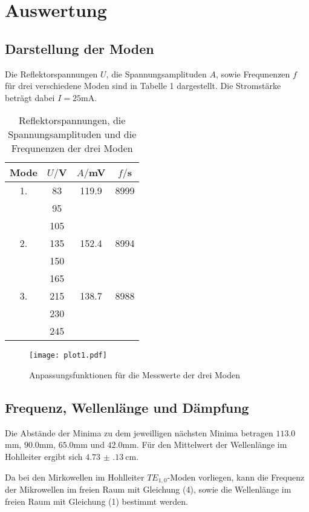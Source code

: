 \section{Auswertung}
\label{sec:Auswertung}

\subsection{Darstellung der Moden}
Die Reflektorspannungen $U$, die Spannungsamplituden $A$, sowie Frequnenzen $f$ für drei verschiedene Moden sind in Tabelle 1 dargestellt.
Die Stromstärke beträgt dabei $I = 25$mA.



\begin{table}[H]
  \centering
  \caption{Reflektorspannungen, die Spannungsamplituden und die Frequnenzen der drei Moden}
  \label{tab:Parameter}
  \begin{tabular}{c c c c}
    \toprule
    Mode & $U/$V & $A/$mV& $f/$s\\
    \midrule
    1. & 83  &   119.9& 8999 \\
       & 95  & &       \\
       & 105 & &       \\
    2. & 135 &   152.4 & 8994 \\
       & 150 & & \\
       & 165 & & \\
    3. & 215 &   138.7 & 8988 \\
       & 230 & & \\
       & 245 & & \\
    \bottomrule
  \end{tabular}
\end{table}

\begin{figure}
  \centering
  \texttt{[image: plot1.pdf]}
  \caption{Anpassungsfunktionen für die Messwerte der drei Moden}
  \label{fig:plot}
\end{figure}



\subsection{Frequenz, Wellenlänge und Dämpfung}
Die Abstände der Minima zu dem jeweilligen nächsten Minima betragen $113.0$mm, $90.0$mm,
$65.0$mm und $42.0$mm.
Für den Mittelwert der Wellenlänge im Hohlleiter ergibt sich $\SI{4.73(13)}{\centi\meter}$.

Da bei den Mirkowellen im Hohlleiter $TE_{1,0}$-Moden vorliegen, kann die Frequenz der
Mikrowellen im freien Raum mit Gleichung (4), sowie die Wellenlänge im freien Raum mit Gleichung (1)
bestimmt werden.

